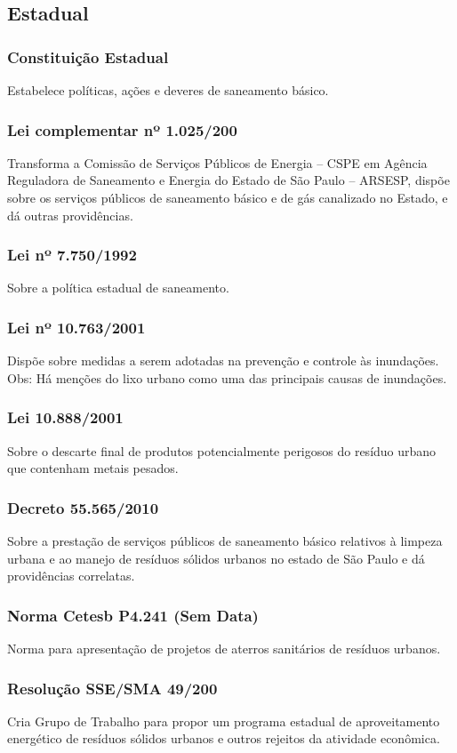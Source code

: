 \begin{subapend}
	\subsection{Estadual}
	\begin{subsubapend}
		\item \subsubsection{Constituição Estadual}
			Estabelece políticas, ações e deveres de saneamento básico.
		 \subsubsection{Lei complementar nº 1.025/200}
			Transforma a Comissão de Serviços Públicos de Energia – CSPE em Agência Reguladora de Saneamento e Energia do Estado de São Paulo – ARSESP, dispõe sobre os serviços públicos de saneamento básico e de gás canalizado no Estado, e dá outras providências.
		 \subsubsection{Lei nº 7.750/1992}
			Sobre a política estadual de saneamento.
		 \subsubsection{Lei nº 10.763/2001}
			Dispõe sobre medidas a serem adotadas na prevenção e controle às inundações. Obs: Há menções do lixo urbano como uma das principais causas de inundações.
		 \subsubsection{Lei 10.888/2001}
			Sobre o descarte final de produtos potencialmente perigosos do resíduo urbano que contenham metais pesados.
		 \subsubsection{Decreto 55.565/2010}
			Sobre a prestação de serviços públicos de saneamento básico relativos à limpeza urbana e ao manejo de resíduos sólidos urbanos no estado de São Paulo e dá providências correlatas.
		 \subsubsection{Norma Cetesb P4.241 (Sem Data)}
			Norma para apresentação de projetos de aterros sanitários de resíduos urbanos.
		 \subsubsection{Resolução SSE/SMA 49/200}
			Cria Grupo de Trabalho para propor um programa estadual de aproveitamento energético de resíduos sólidos urbanos e outros rejeitos da atividade econômica.
	\end{subsubapend}
\end{subapend}

